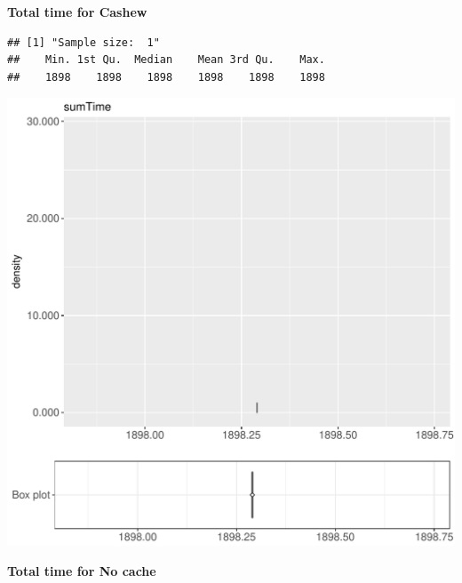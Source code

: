 \documentclass{article}\usepackage[]{graphicx}\usepackage[]{color}
\makeatletter
\def\maxwidth{ %
  \ifdim\Gin@nat@width>\linewidth
    \linewidth
  \else
    \Gin@nat@width
  \fi
}
\newenvironment{kframe}{%
 \def\at@end@of@kframe{}%
 \ifinner\ifhmode%
  \def\at@end@of@kframe{\end{minipage}}%
  \begin{minipage}{\columnwidth}%
 \fi\fi%
 \def\FrameCommand##1{\hskip\@totalleftmargin \hskip-\fboxsep
 \colorbox{shadecolor}{##1}\hskip-\fboxsep
     \hskip-\linewidth \hskip-\@totalleftmargin \hskip\columnwidth}%
 \MakeFramed {\advance\hsize-\width
   \@totalleftmargin\z@ \linewidth\hsize
   \@setminipage}}%
 {\par\unskip\endMakeFramed%
 \at@end@of@kframe}
\newenvironment{knitrout}{}{} %
\makeatother
\begin{document}
 \textbf{Total time for Cashew}
\begin{knitrout}
\color{fgcolor}\begin{kframe}
\begin{verbatim}
## [1] "Sample size:  1"
##    Min. 1st Qu.  Median    Mean 3rd Qu.    Max. 
##    1898    1898    1898    1898    1898    1898
\end{verbatim}


{\ttfamily\noindent\bfseries{}}\end{kframe}
\includegraphics[width=\maxwidth]{figure/RH1_cashew_password2-1} 

\end{knitrout}
 \textbf{Total time for No cache}
\end{document}
